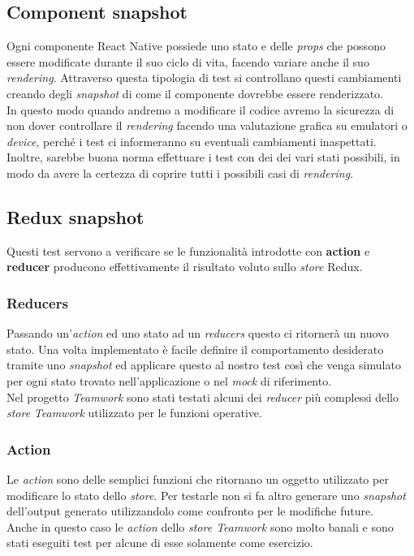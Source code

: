 \subsection{Component snapshot}
Ogni componente React Native possiede uno stato e delle \emph{props} che possono essere modificate durante il suo ciclo di vita, facendo variare anche il suo \emph{rendering}. Attraverso questa tipologia di test si controllano questi cambiamenti creando degli \emph{snapshot} di come il componente dovrebbe essere renderizzato. \\
In questo modo quando andremo a modificare il codice avremo la sicurezza di non dover controllare il \emph{rendering} facendo una valutazione grafica su emulatori o \emph{device}, perché i test ci informeranno su eventuali cambiamenti inaspettati. \\
Inoltre, sarebbe buona norma effettuare i test con dei  dei vari stati possibili, in modo da avere la certezza di coprire tutti i possibili casi di \emph{rendering}.

\subsection{Redux snapshot}
Questi test servono a verificare se le funzionalità introdotte con \textbf{action} e \textbf{reducer} producono effettivamente il risultato voluto sullo \emph{store} Redux. \\
\subsubsection{Reducers}
Passando un'\emph{action} ed uno stato ad un \emph{reducers} questo ci ritornerà un nuovo stato. Una volta implementato è facile definire il comportamento desiderato tramite uno \emph{snapshot} ed applicare questo al nostro test così che venga simulato per ogni stato trovato nell'applicazione o nel \emph{mock} di riferimento. \\
Nel progetto \emph{Teamwork} sono stati testati alcuni dei \emph{reducer} più complessi dello \emph{store} \emph{Teamwork} utilizzato per le funzioni operative.\\

\subsubsection{Action}
Le \emph{action} sono delle semplici funzioni che ritornano un oggetto utilizzato per modificare lo stato dello \emph{store}. Per testarle non si fa altro generare uno \emph{snapshot} dell'output generato utilizzandolo come confronto per le modifiche future. \\
Anche in questo caso le \emph{action} dello \emph{store Teamwork} sono molto banali e sono stati eseguiti test per alcune di esse solamente come esercizio.

